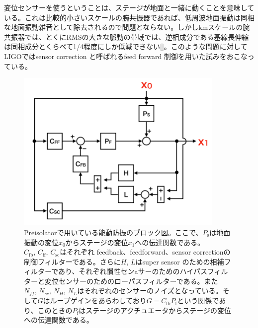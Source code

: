 \documentclass[a4paper,12pt]{jsarticle}
\begin{document}
変位センサーを使うということは、ステージが地面と一緒に動くことを意味している。これは比較的小さいスケールの腕共振器であれば、低周波地面振動は同相な地面振動雑音として除去されるので問題とならない。しかしkmスケールの腕共振器では、とくにRMSの大きな脈動の帯域では、逆相成分である基線長伸縮は同相成分とくらべて1/4程度にしか低減できない[]。このような問題に対してLIGOではsensor correction と呼ばれるfeed forward 制御を用いた試みをおこなっている\cite{hua2005low}\cite{matichard2015seismic}。


\begin{figure}[H]
  \begin{center}
    \includegraphics[width=10.0cm]{./img_2dof_pi.png}
  \end{center}
  \caption{Preisolatorで用いている能動防振のブロック図。ここで、$P_{\mathrm{s}}$は地面振動の変位$x_0$からステージの変位$x_1$への伝達関数である。$C_{\mathrm{fb}},\,C_{\mathrm{ff}},\,C_{\mathrm{sc}}$はそれぞれ feedback、feedforward、sensor correctionの制御フィルターである。さらに$H,\,L$はsuper sensor のための相補フィルターであり、それぞれ慣性センaサーのためのハイパスフィルターと変位センサーのためのローパスフィルターである。また$N_{ff},\,N_{sc},\,N_{H},\,N_{L}$はそれぞれのセンサーのノイズとなっている。そして$G$はループゲインをあらわしており$G=C_{\mathrm{fb}}P_{\mathrm{f}}$という関係であり、このときの$P_{\mathrm{f}}$はステージのアクチュエータからステージの変位への伝達関数である。}\label{img:img_2dof_pi}
\end{figure}
\end{document}
